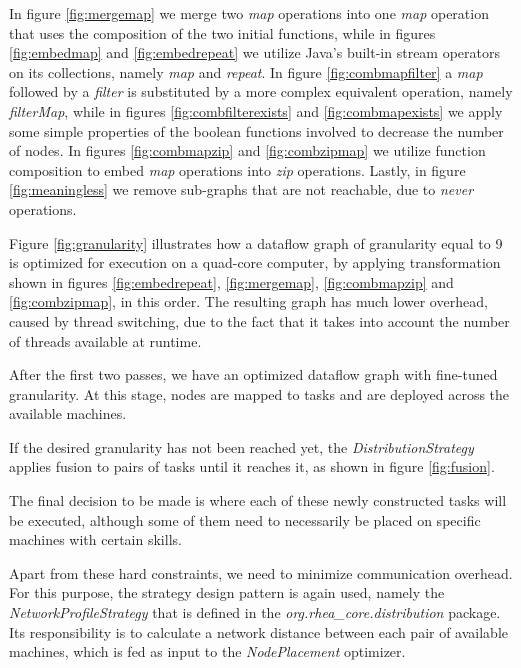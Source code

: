 \documentclass{dithesis}
\begin{document}
\newpage
In figure \ref{fig:mergemap} we merge two \textit{map} operations into one \textit{map} operation that uses the composition of the two initial functions, while in figures \ref{fig:embedmap} and \ref{fig:embedrepeat} we utilize Java's built-in stream operators on its collections, namely \textit{map} and \textit{repeat}. In figure \ref{fig:combmapfilter} a \textit{map} followed by a \textit{filter} is substituted by a more complex equivalent operation, namely \textit{filterMap}, while in figures \ref{fig:combfilterexists} and \ref{fig:combmapexists} we apply some simple properties of the boolean functions involved to decrease the number of nodes. In figures \ref{fig:combmapzip} and \ref{fig:combzipmap} we utilize function composition to embed \textit{map} operations into \textit{zip} operations. Lastly, in figure \ref{fig:meaningless} we remove sub-graphs that are not reachable, due to \textit{never} operations.


Figure \ref{fig:granularity} illustrates how a dataflow graph of granularity equal to 9 is optimized for execution on a quad-core computer, by applying transformation shown in figures \ref{fig:embedrepeat}, \ref{fig:mergemap}, \ref{fig:combmapzip} and \ref{fig:combzipmap}, in this order. The resulting graph has much lower overhead, caused by thread switching, due to the fact that it takes into account the number of threads available at runtime.



After the first two passes, we have an optimized dataflow graph with fine-tuned granularity. At this stage, nodes are mapped to tasks and are deployed across the available machines. 

If the desired granularity has not been reached yet, the \textit{DistributionStrategy} applies fusion to pairs of tasks until it reaches it, as shown in figure \ref{fig:fusion}.


The final decision to be made is where each of these newly constructed tasks will be executed, although some of them need to necessarily be placed on specific machines with certain skills. 

Apart from these hard constraints, we need to minimize communication overhead. For this purpose, the strategy design pattern is again used, namely the \textit{NetworkProfileStrategy} that is defined in the \textit{org.rhea\_core.distribution} package. Its responsibility is to calculate a network distance between each pair of available machines, which is fed as input to the \textit{NodePlacement} optimizer. 
\end{document}
